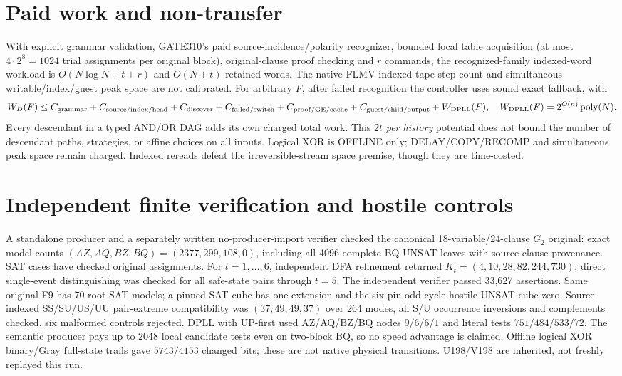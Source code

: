 \documentclass[11pt]{article}
\begin{document}
\section{Paid work and non-transfer}
With explicit grammar validation, GATE310's paid source-incidence/polarity recognizer, bounded local table acquisition (at most $4\cdot2^8=1024$ trial assignments per original block), original-clause proof checking and $r$ commands, the recognized-family indexed-word workload is $O(N\log N+t+r)$ and $O(N+t)$ retained words. The native FLMV indexed-tape step count and simultaneous writable/index/guest peak space are not calibrated. For arbitrary $F$, after failed recognition the controller uses sound exact fallback, with
\[
W_D(F)\le C_{\rm grammar}+C_{\rm source/index/head}
+C_{\rm discover}+C_{\rm failed/switch}+C_{\rm proof/GE/cache}
+C_{\rm guest/child/output}+W_{\rm DPLL}(F),
\quad W_{\rm DPLL}(F)=2^{O(n)}\operatorname{poly}(N).
\]
Every descendant in a typed AND/OR DAG adds its own charged total work. This $2t$ \emph{per history} potential does not bound the number of descendant paths, strategies, or affine choices on all inputs. Logical XOR is OFFLINE only; DELAY/COPY/RECOMP and simultaneous peak space remain charged. Indexed rereads defeat the irreversible-stream space premise, though they are time-costed.
\section{Independent finite verification and hostile controls}
A standalone producer and a separately written no-producer-import verifier checked the canonical 18-variable/24-clause $G_2$ original: exact model counts $(AZ,AQ,BZ,BQ)=(2377,299,108,0)$, including all 4096 complete BQ UNSAT leaves with source clause provenance. SAT cases have checked original assignments. For $t=1,\ldots,6$, independent DFA refinement returned $K_t=(4,10,28,82,244,730)$; direct single-event distinguishing was checked for all safe-state pairs through $t=5$. The independent verifier passed 33,627 assertions. Same original F9 has 70 root SAT models; a pinned SAT cube has one extension and the six-pin odd-cycle hostile UNSAT cube zero. Source-indexed SS/SU/US/UU pair-extreme compatibility was $(37,49,49,37)$ over 264 modes, all S/U occurrence inversions and complements checked, six malformed controls rejected. DPLL with UP-first used AZ/AQ/BZ/BQ nodes $9/6/6/1$ and literal tests $751/484/533/72$. The semantic producer pays up to 2048 local candidate tests even on two-block BQ, so no speed advantage is claimed. Offline logical XOR binary/Gray full-state trails gave $5743/4153$ changed bits; these are not native physical transitions. U198/V198 are inherited, not freshly replayed this run.
\end{document}
